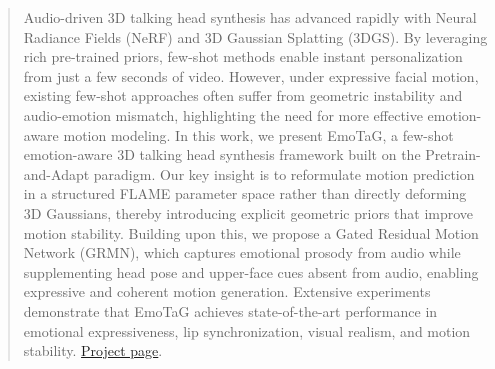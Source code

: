 \begin{abstract}
Audio-driven 3D talking head synthesis has advanced rapidly with Neural Radiance Fields (NeRF) and 3D Gaussian Splatting (3DGS). By leveraging rich pre-trained priors, few-shot methods enable instant personalization from just a few seconds of video. However, under expressive facial motion, existing few-shot approaches often suffer from geometric instability and audio-emotion mismatch, highlighting the need for more effective emotion-aware motion modeling. In this work, we present EmoTaG, a few-shot emotion-aware 3D talking head synthesis framework built on the Pretrain-and-Adapt paradigm. Our key insight is to reformulate motion prediction in a structured FLAME parameter space rather than directly deforming 3D Gaussians, thereby introducing explicit geometric priors that improve motion stability. Building upon this, we propose a Gated Residual Motion Network (GRMN), which captures emotional prosody from audio while supplementing head pose and upper-face cues absent from audio, enabling expressive and coherent motion generation. Extensive experiments demonstrate that EmoTaG achieves state-of-the-art performance in emotional expressiveness, lip synchronization, visual realism, and motion stability. \href{https://emotag26.github.io/}{Project page}.
\end{abstract}